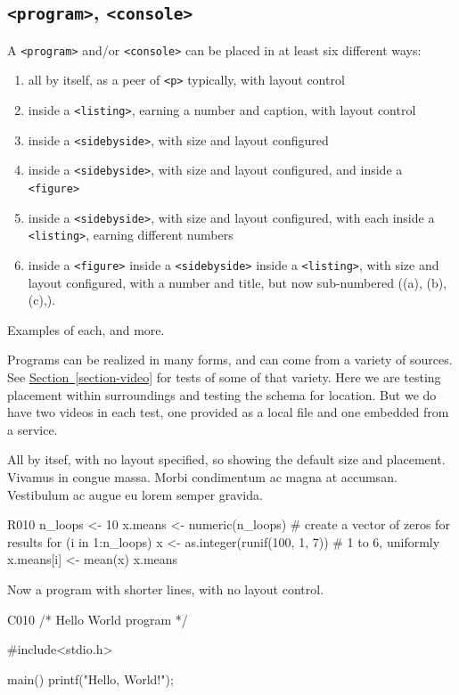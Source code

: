 \documentclass[pdflatex]{sn-jnl}
\theoremstyle{thmstyleone}%
\theoremstyle{thmstyletwo}%
\theoremstyle{thmstylethree}%
\newcommand{\xreffont}{\relax}
\newcommand{\mono}[1]{\texttt{#1}}
\numberwithin{equation}{section}
\begin{document}
\subsection{\mono{<program>}, \mono{<console>}}\label{atomic-program}%
A \mono{<program>} and\slash{}or \mono{<console>} can be placed in at least six  different ways:%
\begin{enumerate}
\item{}all by itself, as a peer of \mono{<p>} typically, with layout control%
\item{}inside a \mono{<listing>}, earning a number and caption, with layout control%
\item{}inside a \mono{<sidebyside>}, with size and layout configured%
\item{}inside a \mono{<sidebyside>}, with size and layout configured, and inside a \mono{<figure>}%
\item{}inside a \mono{<sidebyside>}, with size and layout configured, with each inside a \mono{<listing>}, earning different numbers%
\item{}inside a \mono{<figure>} inside a \mono{<sidebyside>} inside a \mono{<listing>}, with size and layout configured, with a number and title, but now sub-numbered ((a), (b), (c),\textellipsis{}).%
\end{enumerate}
Examples of each, and more.%
\par
Programs can be realized in many forms, and can come from a variety of sources.  See \hyperref[section-video]{Section~{\xreffont\ref{section-video}}} for tests of some of that variety.  Here we are testing placement within surroundings and testing the schema for location.  But we do have two videos in each test, one provided as a local file and one embedded from a service.%
\par
All by itsef, with no layout specified, so showing the default size and placement.  Vivamus in congue massa. Morbi condimentum ac magna at accumsan. Vestibulum ac augue eu lorem semper gravida.%
\begin{program}{R}{0}{1}{0}
n_loops <- 10
x.means <- numeric(n_loops)  # create a vector of zeros for results
for (i in 1:n_loops){
    x <- as.integer(runif(100, 1, 7))  # 1 to 6, uniformly
    x.means[i] <- mean(x)
}
x.means
\end{program}
Now a program with shorter lines, with no layout control.%
\begin{program}{C}{0}{1}{0}
/* Hello World program */

#include<stdio.h>

main()
{
    printf("Hello, World!");
}
\end{program}
\end{document}
